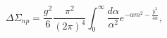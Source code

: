 \begin{equation}
 \Delta\Sigma_{np} = \frac{g^2}6\frac{\pi^2}{(2\pi)^4}\int_0^\infty 
 \frac{d\alpha}{\alpha^2} e^{-\alpha m^2-\frac{\tilde p^2}{4\alpha}},
\end{equation}

